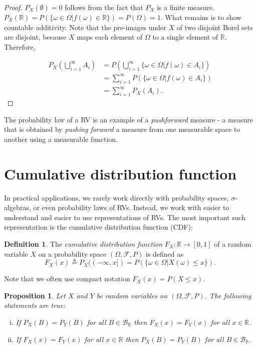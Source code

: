 \documentclass{book}
\theoremstyle{plain}%
\newtheorem{proposition}{Proposition}[section]
\theoremstyle{definition}
\newtheorem{definition}{Definition}[section]
\newlength{\arrow}
\begin{document}
\begin{proof}
$P_X(\emptyset) = 0$ follows from the fact that $P_X$ is a finite measure. $P_X(\mathbb{R}) = P(\{\omega \in \Omega | f(\omega) \in \mathbb{R}\}) = P(\Omega) = 1$. What remains is to show countable additivity. Note that the pre-images under $X$ of two disjoint Borel sets are disjoint, because $X$ maps each element of $\Omega$ to a single element of $\mathbb{R}$. Therefore,

\begin{align*}
    P_X(\bigcup_{i=1}^\infty A_i) &= P(\bigcup_{i=1}^\infty  \{\omega \in \Omega | f(\omega) \in A_i\}) \\
    &= \sum_{i=1}^\infty P(\{\omega \in \Omega | f(\omega) \in A_i\}) \\ 
    &= \sum_{i=1}^\infty P_X(A_i).
\end{align*}

\end{proof}

The probability law of a RV is an example of a \emph{pushforward} measure - a measure that is obtained by \emph{pushing forward} a measure from one measurable space to another using a measurable function.

\section{Cumulative distribution function}

In practical applications, we rarely work directly with probability spaces, $\sigma$-algebras, or even probability laws of RVs. Instead, we work with easier to understand and easier to use representations of RVs. The most important such representation is the cumulative distribution function (CDF): 

\begin{definition}The \textit{cumulative distribution function} $F_X: \mathbb{R} \rightarrow [0, 1]$ of a random variable $X$ on a probability space $(\Omega, \mathcal{F}, P)$ is defined as $$F_X(x) \triangleq P_X((-\infty,x]) = P(\{\omega \in \Omega | X(\omega) \leq x\}) .$$
\end{definition}

Note that we often use compact notation $F_X(x) = P(X \leq x)$.

\begin{proposition}
Let $X$ and $Y$ be random variables on $(\Omega, \mathcal{F}, P)$. The following statements are true:
\begin{enumerate}[(i)]
\item If $P_X(B) = P_Y(B)$ for all $B \in \mathcal{B}_\mathbb{R}$ then $F_X(x) = F_Y(x)$ for all $x \in \mathbb{R}$.
\item If $F_X(x) = F_Y(x)$ for all $x \in \mathbb{R}$ then $P_X(B) = P_Y(B)$ for all $B \in \mathcal{B}_\mathbb{R}$.
\end{enumerate}
\end{proposition}
\end{document}
